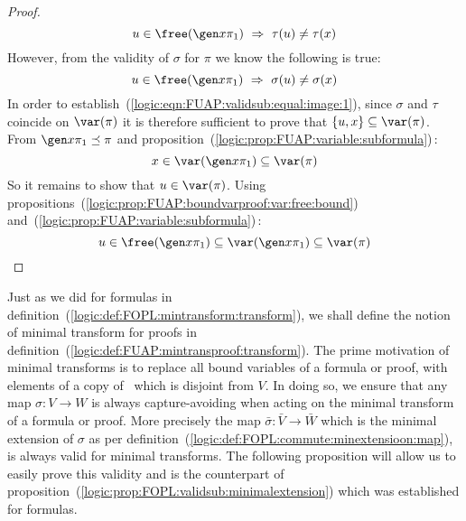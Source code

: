 \begin{proof}
\begin{equation}
    u\in\free(\gen x\pi_{1})\ \Rightarrow\
    \tau(u)\neq\tau(x)
    \end{equation}
However, from the validity of $\sigma$ for $\pi$ we know the
following is true:
    \begin{equation}\label{logic:eqn:FUAP:validsub:equal:image:2}
    u\in\free(\gen x\pi_{1})\ \Rightarrow\
    \sigma(u)\neq\sigma(x)
    \end{equation}
In order to establish~(\ref{logic:eqn:FUAP:validsub:equal:image:1}),
since $\sigma$ and $\tau$ coincide on $\var(\pi)$ it is therefore
sufficient to prove that $\{u,x\}\subseteq\var(\pi)$. From $\gen
x\pi_{1}\preceq\pi$ and
proposition~(\ref{logic:prop:FUAP:variable:subformula})\,:
    \[
    x\in\var(\gen x\pi_{1})\subseteq\var(\pi)
    \]
So it remains to show that $u\in\var(\pi)$. Using
propositions~(\ref{logic:prop:FUAP:boundvarproof:var:free:bound})
and~(\ref{logic:prop:FUAP:variable:subformula})\,:
    \[
    u\in\free(\gen x\pi_{1})\subseteq \var(\gen x\pi_{1})\subseteq\var(\pi)
    \]
\end{proof}

Just as we did for formulas in
definition~(\ref{logic:def:FOPL:mintransform:transform}), we shall
define the notion of minimal transform for proofs in
definition~(\ref{logic:def:FUAP:mintransproof:transform}). The prime
motivation of minimal transforms is to replace all bound variables
of a formula or proof, with elements of a copy of \N\ which is
disjoint from $V$. In doing so, we ensure that any map $\sigma:V\to
W$ is always capture-avoiding when acting on the minimal transform
of a formula or proof. More precisely the map
$\bar{\sigma}:\bar{V}\to\bar{W}$ which is the minimal extension of
$\sigma$ as per
definition~(\ref{logic:def:FOPL:commute:minextensioon:map}), is
always valid for minimal transforms. The following proposition will
allow us to easily prove this validity and is the counterpart of
proposition~(\ref{logic:prop:FOPL:validsub:minimalextension}) which
was established for formulas.

